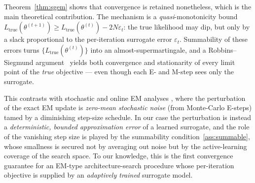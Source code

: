 Theorem~\ref{thm:sgem} shows that convergence is retained nonetheless,
which is the main theoretical contribution. The mechanism is a
\emph{quasi}-monotonicity bound
$L_{\mathrm{true}}(\theta^{(t+1)}) \geq L_{\mathrm{true}}(\theta^{(t)}) - 2N\varepsilon_t$:
the true likelihood may dip, but only by a slack proportional to the
per-iteration surrogate error $\varepsilon_t$. Summability of these
errors turns $\{L_{\mathrm{true}}(\theta^{(t)})\}$ into an
almost-supermartingale, and a Robbins--Siegmund
argument~\cite{robbins1971convergence} yields both convergence and
stationarity of every limit point of the \emph{true} objective --- even
though each E- and M-step sees only the surrogate.

This contrasts with stochastic and online EM analyses
\cite{cappe2009online}, where the perturbation of the exact EM update is
\emph{zero-mean stochastic noise} (from Monte-Carlo E-steps) tamed by a
diminishing step-size schedule. In our case the perturbation is instead
a \emph{deterministic, bounded approximation error} of a learned
surrogate, and the role of the vanishing step size is played by the
summability condition~\ref{ass:summable}, whose smallness is secured not
by averaging out noise but by the active-learning coverage of the
search space. To our knowledge, this is the first convergence guarantee
for an EM-type architecture-search procedure whose per-iteration
objective is supplied by an \emph{adaptively trained} surrogate model.
